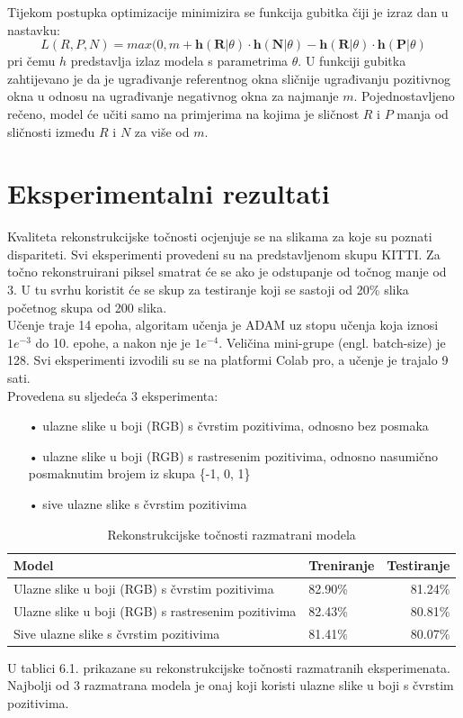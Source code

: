 \documentclass[times, utf8, zavrsni, numeric]{fer}
\begin{document}
\pagebreak
Tijekom postupka optimizacije minimizira se funkcija gubitka čiji je izraz dan u nastavku:
\begin{equation}
L(R, P, N) = max(0, m + \textbf{h}(\textbf{R}|\theta)\cdot \textbf{h}(\textbf{N}|\theta)-\textbf{h}(\textbf{R}|\theta)\cdot \textbf{h}(\textbf{P}|\theta)
\label{eq:gubitak}
\end{equation}
pri čemu $h$ predstavlja izlaz modela s parametrima $\theta$. U funkciji gubitka zahtijevano je da je ugrađivanje referentnog okna sličnije ugrađivanju pozitivnog okna u odnosu na ugrađivanje negativnog okna za najmanje $m$. Pojednostavljeno rečeno, model će učiti samo na primjerima na kojima je sličnost $R$ i $P$ manja od sličnosti između $R$ i $N$ za više od $m$.\cite{orsic}

\chapter{Eksperimentalni rezultati}
Kvaliteta rekonstrukcijske točnosti ocjenjuje se na slikama za koje su poznati dispariteti. Svi eksperimenti provedeni su na predstavljenom skupu KITTI. Za točno rekonstruirani piksel smatrat će se ako je odstupanje od točnog manje od 3. U tu svrhu koristit će se skup za testiranje koji se sastoji od 20\% slika početnog skupa od 200 slika.\\
Učenje traje 14 epoha, algoritam učenja je ADAM uz stopu učenja koja iznosi $1e^{-3}$ do 10. epohe, a nakon nje je $1e^{-4}$. Veličina mini-grupe (engl. batch-size) je 128.  Svi eksperimenti izvodili su se na platformi Colab pro, a učenje je trajalo 9 sati.\\
Provedena su sljedeća 3 eksperimenta:
\begin{itemize}
\item[•]ulazne slike u boji (RGB) s čvrstim pozitivima, odnosno bez posmaka
\item[•]ulazne slike u boji (RGB) s rastresenim pozitivima, odnosno nasumično \linebreak posmaknutim brojem iz skupa \{-1, 0, 1\}
\item[•]sive ulazne slike s čvrstim pozitivima
\end{itemize}

\begin{table}[htb]
\caption{Rekonstrukcijske točnosti razmatrani modela}
\label{tbl:konstante}
\centering
\begin{tabular}{llr} \hline
Model & Treniranje & Testiranje\\ \hline
Ulazne slike u boji (RGB) s čvrstim pozitivima & 82.90\% & 81.24\% \\
Ulazne slike u boji (RGB) s rastresenim pozitivima & 82.43\% & 80.81\% \\
Sive ulazne slike s čvrstim pozitivima & 81.41\% & 80.07\% \\ \hline
\end{tabular}
\end{table}
U tablici 6.1. prikazane su rekonstrukcijske točnosti razmatranih eksperimenata. Najbolji od 3 razmatrana modela je onaj koji koristi ulazne slike u boji s čvrstim pozitivima.\pagebreak
\end{document}
